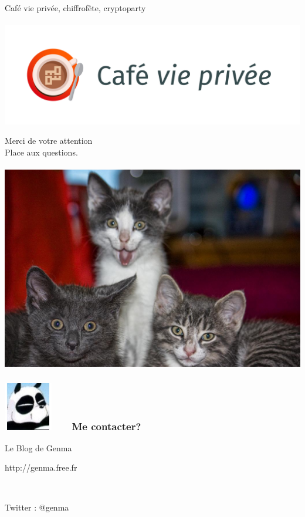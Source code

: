 \documentclass{beamer}
\begin{document}
\begin{frame}
\begin{center}
\Huge{Café vie privée, chiffrofête, cryptoparty}
\\~\\
\includegraphics[scale=0.3] {./images/LogoCafeViePrivee.jpg}
\end{center}
\end{frame}
\begin{frame}
\begin{center}
\Huge{Merci de votre attention}
\\
\Huge{Place aux questions.}
\\~\\
\includegraphics[scale=0.2] {./images/chat.jpg}
\end{center}
\end{frame}

\begin{frame}
\frametitle{\includegraphics[scale=0.4]{./images/Genma.jpg} \ \ \  Me contacter?}
\Huge{\centerline{Le Blog de Genma}}
\Huge{\centerline{http://genma.free.fr}}
\Huge{\centerline{~}}
\Huge{\centerline{Twitter : @genma}}
\end{frame}

\end{document}
